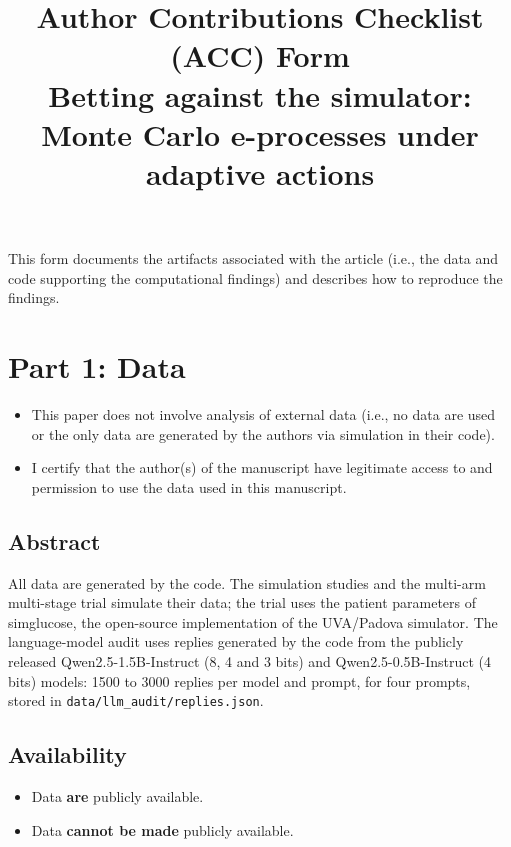 \documentclass[11pt]{article}
\title{Author Contributions Checklist (ACC) Form\\[6pt]
\large Betting against the simulator: Monte Carlo e-processes under adaptive actions}
\date{}
\providecommand{\tightlist}{\setlength{\itemsep}{0pt}\setlength{\parskip}{0pt}}
\begin{document}
\maketitle
This form documents the artifacts associated with the article (i.e., the
data and code supporting the computational findings) and describes how
to reproduce the findings.

\hypertarget{part-1-data}{%
\section{Part 1: Data}\label{part-1-data}}

\begin{itemize}
\tightlist
\item[$\boxtimes$]
  This paper does not involve analysis of external data (i.e., no data
  are used or the only data are generated by the authors via simulation
  in their code).
\item[$\boxtimes$]
  I certify that the author(s) of the manuscript have legitimate access
  to and permission to use the data used in this manuscript.
\end{itemize}

\hypertarget{abstract}{%
\subsection{Abstract}\label{abstract}}

All data are generated by the code. The simulation studies and the
multi-arm multi-stage trial simulate their data; the trial uses the
patient parameters of simglucose, the open-source implementation of the
UVA/Padova simulator. The language-model audit uses replies generated by
the code from the publicly released Qwen2.5-1.5B-Instruct (8, 4 and 3
bits) and Qwen2.5-0.5B-Instruct (4 bits) models: 1500 to 3000 replies
per model and prompt, for four prompts, stored in
\texttt{data/llm\_audit/replies.json}.

\hypertarget{availability}{%
\subsection{Availability}\label{availability}}

\begin{itemize}
\tightlist
\item[$\boxtimes$]
  Data \textbf{are} publicly available.
\item[$\square$]
  Data \textbf{cannot be made} publicly available.
\end{itemize}
\end{document}

